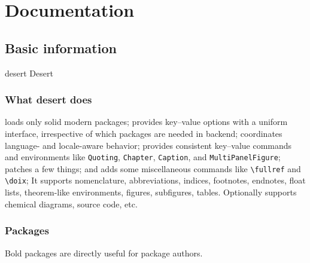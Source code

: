 
\part{Documentation}

\chapter{Basic information}

\NewExpandableDocumentCommand \desert {} {desert}
\NewExpandableDocumentCommand \Desert {} {Desert}

\def \sep {{}\thinspace|\thinspace}
\def \ltb {\textbf{<}}
\def \gtb {\textbf{>}}

\begin{BigPages} [hmargin=0.5cm, vmargin=1cm]

\section{What desert does}

\Desert
loads only solid modern packages;
provides key--value options with a uniform interface, irrespective of which packages are needed in backend;
coordinates language- and locale-aware behavior;
provides consistent key--value commands and environments like \verb|Quoting|, \verb|Chapter|,
\verb|Caption|, and \verb|MultiPanelFigure|;
patches a few things;
and adds some miscellaneous commands like \verb|\fullref| and \verb|\doix|;
It supports nomenclature, abbreviations, indices, footnotes, endnotes, float lists,
theorem-like environments, figures, subfigures, tables.
Optionally supports chemical diagrams, source code, etc.

\section{Packages}

Bold packages are directly useful for package authors.


\end{BigPages}
